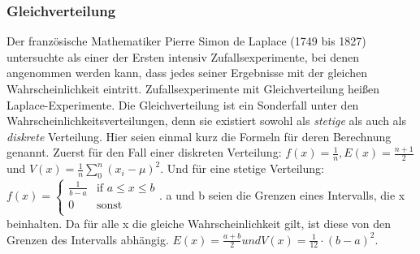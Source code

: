 \documentclass[letterpaper, titlepage]{article}
\begin{document}
\subsubsection{Gleichverteilung}\label{Gleichverteilung}
Der französische Mathematiker Pierre Simon de Laplace (1749 bis 1827) untersuchte als einer der Ersten intensiv Zufallsexperimente, bei denen angenommen werden kann, dass jedes seiner Ergebnisse mit der gleichen Wahrscheinlichkeit eintritt. Zufallsexperimente mit Gleichverteilung heißen Laplace-Experimente. Die Gleichverteilung ist ein Sonderfall unter den Wahrscheinlichkeitsverteilungen, denn sie existiert sowohl als \textit{stetige} als auch als \textit{diskrete} Verteilung. Hier seien einmal kurz die Formeln für deren Berechnung genannt. Zuerst für den Fall einer diskreten Verteilung:
$f(x)=\frac{1}{n}, E(x)=\frac{n+1}{2}$ und $V(x)=\frac{1}{n}\sum_{0}^{n}(x_i-\mu)^2$. Und für eine stetige Verteilung: 
$f(x)=
\begin{cases}
    \frac{1}{b-a} & \text{if } a \leq x \leq b \\
    0 & \text{sonst} \\
\end{cases}$. a und b seien die Grenzen eines Intervalls, die x beinhalten. Da für alle x die gleiche Wahrscheinlichkeit gilt, ist diese von den Grenzen des Intervalls abhängig. $E(x)=\frac{a+b}{2} und V(x)=\frac{1}{12}\cdot (b-a)^2$.

\vspace{0.35cm}
\end{document}
